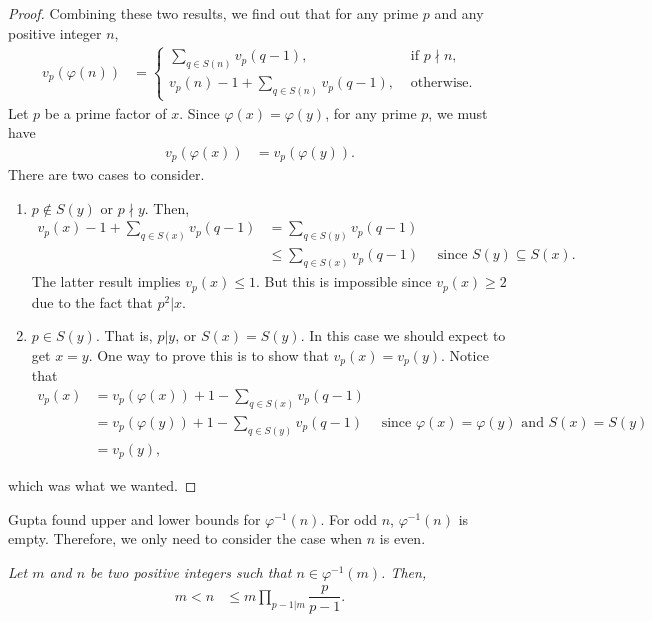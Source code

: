 \documentclass{subfile}
\begin{document}
\begin{proof}
			Combining these two results, we find out that for any prime $p$ and any positive integer $n$,
				\begin{align*}
					v_p(\varphi(n)) & = 
						\begin{cases}
							\displaystyle\sum_{q\in S(n)}v_p(q-1),&\text{ if }p\nmid n,\\
							v_p(n)-1+\displaystyle \sum_{q\in S(n)}v_p(q-1),&\text{ otherwise}.
						\end{cases}
				\end{align*}
			Let $p$ be a prime factor of $x$. Since $\varphi(x)=\varphi(y)$, for any prime $p$, we must have
				\begin{align*}
					v_p(\varphi(x)) & = v_p(\varphi(y)).
				\end{align*}
			There are two cases to consider.
				\begin{enumerate}[1.]
					\item $p\notin S(y)$ or $p\nmid y$. Then,
							\begin{align*}
								v_p(x)-1+\sum_{q\in S(x)}v_p(q-1) & = \sum_{q\in S(y)}v_p(q-1)\\
																	  & \leq\sum_{q\in S(x)}v_p(q-1) \quad \text{ since }S(y)\subseteq S(x).
							\end{align*}
						The latter result implies $v_p(x) \leq 1.$ But this is impossible since $v_p(x)\geq2$ due to the fact that $p^2|x$.
					\item $p\in S(y)$. That is, $p|y$, or $S(x)=S(y)$. In this case we should expect to get $x=y$. One way to prove this is to show that $v_p(x)=v_p(y)$. Notice that
						\begin{align*}
							v_p(x) & = v_p(\varphi(x))+1-\sum_{q\in S(x)} v_p(q-1)\\
									 & = v_p(\varphi(y))+1-\sum_{q\in S(y)} v_p(q-1)\quad \text{ since }\varphi(x)=\varphi(y)\text{ and }S(x)=S(y)\\
									 & = v_p(y),
						\end{align*}
				\end{enumerate}
			which was what we wanted.
		\end{proof}
	
	Gupta \cite{gupta} found upper and lower bounds for $\varphi^{-1}(n)$. For odd $n$, $\varphi^{-1}(n)$ is empty. Therefore, we only need to consider the case when $n$ is even. 
		\begin{theorem}[Gupta]\slshape\label{thm:gupta}
			Let $m$ and $n$ be two positive integers such that $n\in\varphi^{-1}(m)$. Then,
				\begin{align*}
					m < n & \leq m\prod_{p-1|m}\dfrac{p}{p-1}.
				\end{align*}
		\end{theorem}
		
\end{document}
